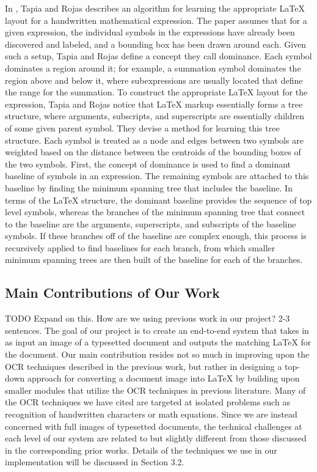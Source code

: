 \documentclass[12pt]{IEEEtran}
\newcommand{\latex}{\LaTeX\xspace}
\begin{document}
In \cite{4}, Tapia and Rojas describes an algorithm for learning the appropriate \latex layout for a handwritten mathematical expression. The paper assumes that for a given expression, the individual symbols in the expressions have already been discovered and labeled, and a bounding box has been drawn around each. Given such a setup, Tapia and Rojas define a concept they call dominance. Each symbol dominates a region around it; for example, a summation symbol dominates the region above and below it, where subexpressions are usually located that define the range for the summation. To construct the appropriate \latex layout for the expression, Tapia and Rojas notice that \latex markup essentially forms a tree structure, where arguments, subscripts, and superscripts are essentially children of some given parent symbol. They devise a method for learning this tree structure. Each symbol is treated as a node and edges between two symbols are weighted based on the distance between the centroids of the bounding boxes of the two symbols. First, the concept of dominance is used to find a dominant baseline of symbols in an expression. The remaining symbols are attached to this baseline by finding the minimum spanning tree that includes the baseline. In terms of the \latex structure, the dominant baseline provides the sequence of top level symbols, whereas the branches of the minimum spanning tree that connect to the baseline are the arguments, superscripts, and subscripts of the baseline symbols. If these branches off of the baseline are complex enough, this process is recursively applied to find baselines for each branch, from which smaller minimum spanning trees are then built of the baseline for each of the branches.

\subsection{Main Contributions of Our Work}
TODO Expand on this. How are we using previous work in our project? 2-3 sentences.
The goal of our project is to create an end-to-end system that takes in as input an image of a typesetted document and outputs the matching \latex for the document. Our main contribution resides not so much in improving upon the OCR techniques described in the previous work, but rather in designing a top-down approach for converting a document image into \latex by building upon smaller modules that utilize the OCR techniques in previous literature. Many of the OCR techniques we have cited are targeted at isolated problems such as recognition of handwritten characters or math equations. Since we are instead concerned with full images of typesetted documents, the technical challenges at each level of our system are related to but slightly different from those discussed in the corresponding prior works. Details of the techniques we use in our implementation will be discussed in Section 3.2.
\end{document}
